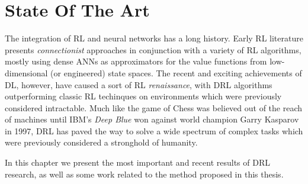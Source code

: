 \chapter{State Of The Art}
\label{chapter3_state_of_the_art}
\thispagestyle{empty}

\vspace{0.5cm}

\noindent The integration of RL and neural networks has a long history. Early 
RL literature \cite{rummery1994line, tesauro1995temporal, bertsekas1995neuro}
presents \textit{connectionist} approaches in conjunction with a variety
of RL algorithms, mostly using dense ANNs as approximators for the value 
functions from low-dimensional (or engineered) state spaces.
The recent and exciting achievements of DL, however, have caused a sort of 
RL \textit{renaissance}, with DRL algorithms outperforming classic RL techinques
on environments which were previously considered intractable. 
Much like the game of Chess was believed out of the reach of machines until 
IBM's \textit{Deep Blue} \cite{campbell2002deep} won against world champion 
Garry Kasparov in 1997, DRL has paved the way to solve a wide spectrum of 
complex tasks which were previously considered a stronghold of humanity. 

In this chapter we present the most important and recent results of DRL research, 
as well as some work related to the method proposed in this thesis.

